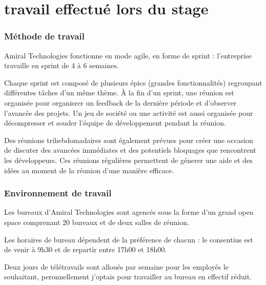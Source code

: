 \section{travail effectué lors du stage}
\subsubsection{Méthode de travail}
Amiral Technologies fonctionne en mode agile, en forme de sprint : l’entreprise travaille en sprint de 4 à 6 semaines.

Chaque sprint est composé de plusieurs épics (grandes fonctionnalités) regroupant différentes tâches d'un même thème.
À la fin d’un sprint, une réunion est organisée pour organisrer un feedback de la dernière période et d'observer l'avancée des projets.
Un jeu de société ou une activité est aussi organisée pour décompresser et souder l'équipe de développement pendant la réunion.

Des réunions trihebdomadaires sont également prévues pour créer une occasion de discuter des avancées immédiates et des potentiels bloquages que rencontrent les développeurs.
Ces réunions régulières permettent de génerer une aide et des idées au moment de la réunion d'une manière efficace.

\subsubsection{Environnement de travail}
Les bureaux d'Amiral Technologies sont agencés sous la forme d'un grand open space comprenant 20 bureaux et de deux salles de réunion.

Les horaires de bureau dépendent de la préférence de chacun : le consentius est de venir à 9h30 et de repartir entre 17h00 et 18h00.

Deux jours de télétravails sont alloués par semaine pour les employés le souhaitant, peronnellement j'optais pour travailler au bureau en effectif réduit.